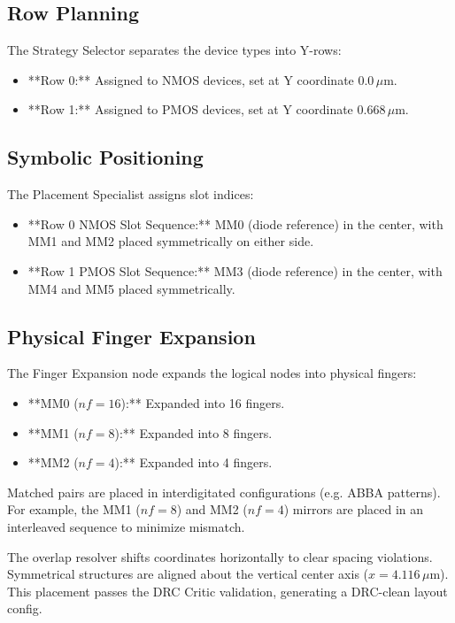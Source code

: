 \subsection{Row Planning}
The Strategy Selector separates the device types into Y-rows:
\begin{itemize}
    \item **Row 0:** Assigned to NMOS devices, set at Y coordinate $0.0\,\mu\text{m}$.
    \item **Row 1:** Assigned to PMOS devices, set at Y coordinate $0.668\,\mu\text{m}$.
\end{itemize}

\subsection{Symbolic Positioning}
The Placement Specialist assigns slot indices:
\begin{itemize}
    \item **Row 0 NMOS Slot Sequence:** MM0 (diode reference) in the center, with MM1 and MM2 placed symmetrically on either side.
    \item **Row 1 PMOS Slot Sequence:** MM3 (diode reference) in the center, with MM4 and MM5 placed symmetrically.
\end{itemize}

\subsection{Physical Finger Expansion}
The Finger Expansion node expands the logical nodes into physical fingers:
\begin{itemize}
    \item **MM0 ($nf=16$):** Expanded into 16 fingers.
    \item **MM1 ($nf=8$):** Expanded into 8 fingers.
    \item **MM2 ($nf=4$):** Expanded into 4 fingers.
\end{itemize}

Matched pairs are placed in interdigitated configurations (e.g. ABBA patterns). For example, the MM1 ($nf=8$) and MM2 ($nf=4$) mirrors are placed in an interleaved sequence to minimize mismatch.

The overlap resolver shifts coordinates horizontally to clear spacing violations. Symmetrical structures are aligned about the vertical center axis ($x = 4.116\,\mu\text{m}$). This placement passes the DRC Critic validation, generating a DRC-clean layout config.


